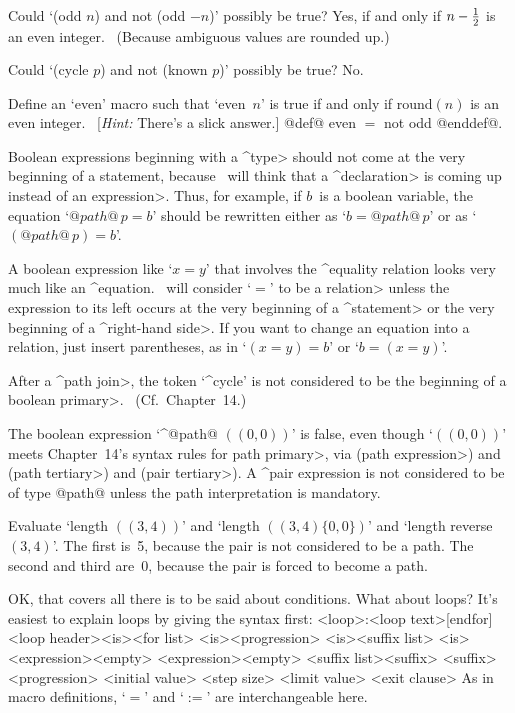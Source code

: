 \dangerexercise Could `(odd $n$) and not (odd $-n$)' possibly be true?
\answer Yes, if and only if $n-{1\over2}$ is an even integer. \ (Because
ambiguous values are rounded up.)

\dangerexercise Could `(cycle $p$) and not (known $p$)' possibly be true?
\answer No.

\dangerexercise Define an `even' macro such that `even~$n$' is true if
and only if round$(n)$ is an even integer. \ [{\sl Hint:\/} There's a
slick answer.]
\answer @def@ even $=$ not odd @enddef@.

\ddanger Boolean expressions beginning with a ^\<type> should not come
at the very beginning of a statement, because \MF\ will think that
a ^\<declaration> is coming up instead of an \<expression>. Thus, for
example, if $b$~is a boolean variable, the equation `$@path@\,p=b$'
should be rewritten either as `$b=@path@\,p$' or as `$(@path@\,p)=b$'.

\ddanger A boolean expression like `$x=y$' that involves the ^{equality}
relation looks very much like an ^{equation}. \MF\ will consider `$=$'
to be a \<relation> unless the expression to its left occurs at the
very beginning of a ^\<statement> or the very beginning of a ^\<right-hand
side>. If you want to change an equation into a relation,
just insert parentheses, as in `$(x=y)=b$' or `$b=(x=y)$'.

\ddanger After a ^\<path join>, the token `^{cycle}' is not considered
to be the beginning of a \<boolean primary>. \ (Cf.\ Chapter~14.)

\ddanger The boolean expression `^@path@ $((0,0))$' is false, even
though `$((0,0))$' meets Chapter~14's syntax rules for
\<path primary>, via (\<path expression>) and
(\<path tertiary>) and
(\<pair tertiary>). A ^{pair expression} is not considered to be
of type @path@ unless the path interpretation is mandatory.

\ddangerexercise Evaluate `length $((3,4))$' and `length $((3,4)\{0,0\})$'
and `length reverse~$(3,4)$'.
\answer The first is~5, because the pair is not considered to be a path.
The second and third are~0, because the pair is forced to become a path.

OK, that covers all there is to be said about conditions. What about
loops? It's easiest to explain loops by giving the syntax first:
\beginsyntax
<loop>:<loop text>[endfor]
<loop header><is><for list>
 <is><progression>
 <is><suffix list>
 \alt[forever]
<is>\is[=]\is<expression>\alt<empty>
 \alt<for list>[,]<expression><empty>
<suffix list>\is<suffix>
 <suffix>
<progression>
<initial value>
<step size>
<limit value>
<exit clause>
\endsyntax
As in macro definitions, `$=$' and `$:=$' are interchangeable here.


